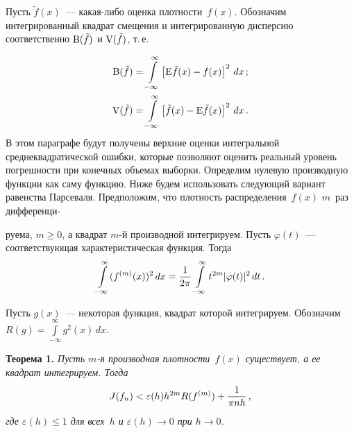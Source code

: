 \begin{multicols}{2}
\vspace*{-1pt}

Пусть $\tilde f(x)$~--- какая-либо оценка плотности~$f(x)$. 
Обозначим интегрированный квадрат смещения и интегрированную
дисперсию соответственно ${\rm B}(\tilde f)$ и ${\rm V}(\tilde f)$, т.\,е.\

\noindent
\begin{align*}
{\rm B}(\tilde f)&=\int\limits_{-\infty}^\infty\left[{\rm E}\tilde f(x)-f(x)\right]^2\,dx\,;\\
{\rm V}(\tilde f)&=
\int\limits_{-\infty}^\infty\left[\tilde f(x)-{\rm E}\tilde f(x)\right]^2\,dx\,.
\end{align*}
В этом параграфе будут получены верхние оценки интегральной среднеквадратической
ошибки, которые позволяют оценить реальный уровень погрешности
при конечных объемах выборки.
Определим нулевую производную функции как саму функцию. Ниже будем
использовать следующий вариант равенства Парсеваля.
Предположим, что плотность распределения~$f(x)$ $m$~раз дифференци-\linebreak\vspace*{-12pt}
\columnbreak

\noindent
руема,
$m\ge0$, а квадрат $m$-й производной интегрируем.
Пусть $\varphi(t)$~--- соответствующая характеристическая функция.
Тогда
\begin{equation}
\int\limits_{-\infty}^\infty(f^{(m)}(x))^2\,dx=
\displaystyle\frac{\displaystyle 1\mathstrut}{\displaystyle 2\pi\mathstrut}\int\limits_{-\infty}^\infty t^{2m}|\varphi(t)|^2\,dt\,.
\label{e4-u1}
\end{equation}

Пусть $g(x)$~--- некоторая функция, квадрат которой интегрируем. Обозначим
$R(g)=\int\limits_{-\infty}^\infty g^2(x)\,dx$.

\medskip

\noindent
\textbf{Теорема 1.} \textit{Пусть $m$-я производная плотности~$f(x)$
существует, а ее квадрат интегрируем. Тогда}
\begin{equation}
J(f_n)<\varepsilon(h)h^{2m}R(f^{(m)})+\displaystyle\frac{\displaystyle 1\mathstrut}{\displaystyle \pi nh\mathstrut}\,,
\label{e5-u1}
\end{equation}
\textit{где $\varepsilon(h)\le1$ для всех~$h$ и $\varepsilon(h)\to0$ при $h\to0$.}

\medskip


\end{multicols}
